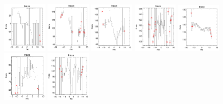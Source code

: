 \documentclass[fleqn,usenatbib]{mnras}
\begin{document}
\begin{figure}
    \includegraphics[width=0.19\textwidth]{Images/trace-plots/trace-plots-cpsbs/8933-3704.png}
    \includegraphics[width=0.19\textwidth]{Images/trace-plots/trace-plots-cpsbs/8934-9101.png}
    \includegraphics[width=0.19\textwidth]{Images/trace-plots/trace-plots-cpsbs/8935-12701.png}
    \includegraphics[width=0.19\textwidth]{Images/trace-plots/trace-plots-cpsbs/8938-6102.png}
    \includegraphics[width=0.19\textwidth]{Images/trace-plots/trace-plots-cpsbs/8941-3701.png}
    \includegraphics[width=0.19\textwidth]{Images/trace-plots/trace-plots-cpsbs/8944-1902.png}
    \includegraphics[width=0.19\textwidth]{Images/trace-plots/trace-plots-cpsbs/8950-3704.png}

\end{figure}
\end{document}
